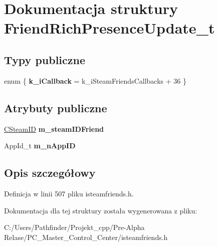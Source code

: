 \hypertarget{struct_friend_rich_presence_update__t}{}\section{Dokumentacja struktury Friend\+Rich\+Presence\+Update\+\_\+t}
\label{struct_friend_rich_presence_update__t}
\subsection*{Typy publiczne}
\begin{DoxyCompactItemize}
\item 
\mbox{\label{struct_friend_rich_presence_update__t_ac71d8b235445e025f816a288ff3e2c90}} 
enum \{ {\bfseries k\+\_\+i\+Callback} = k\+\_\+i\+Steam\+Friends\+Callbacks + 36
 \}
\end{DoxyCompactItemize}
\subsection*{Atrybuty publiczne}
\begin{DoxyCompactItemize}
\item 
\mbox{\label{struct_friend_rich_presence_update__t_a0f7762ac8320ef3267facf379f6fd1f1}} 
\hyperlink{class_c_steam_i_d}{C\+Steam\+ID} {\bfseries m\+\_\+steam\+I\+D\+Friend}
\item 
\mbox{\label{struct_friend_rich_presence_update__t_ade5a7282d7db117969972a3ec0510b5b}} 
App\+Id\+\_\+t {\bfseries m\+\_\+n\+App\+ID}
\end{DoxyCompactItemize}


\subsection{Opis szczegółowy}


Definicja w linii 507 pliku isteamfriends.\+h.



Dokumentacja dla tej struktury została wygenerowana z pliku\+:\begin{DoxyCompactItemize}
\item 
C\+:/\+Users/\+Pathfinder/\+Projekt\+\_\+cpp/\+Pre-\/\+Alpha Relase/\+P\+C\+\_\+\+Master\+\_\+\+Control\+\_\+\+Center/isteamfriends.\+h\end{DoxyCompactItemize}

